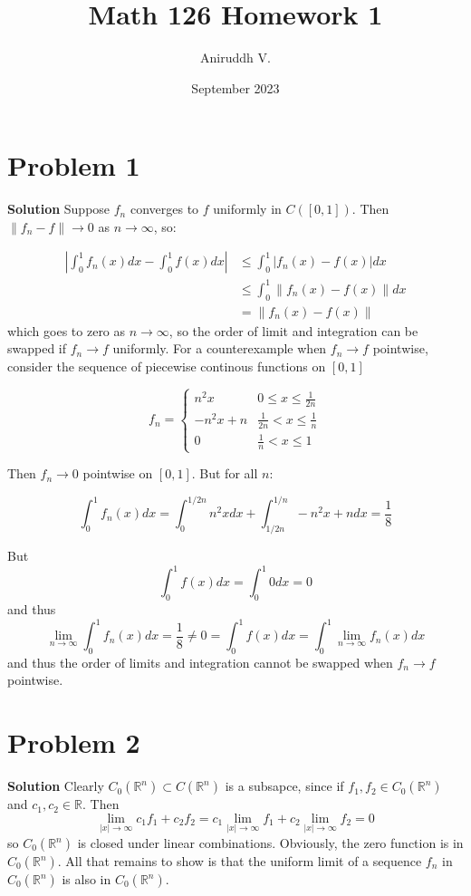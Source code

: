 \documentclass{article}
\title{Math 126 Homework 1}
\author{Aniruddh V.}
\date{September 2023}
\newcommand{\R}{\mathbb{R}}
\begin{document}
\maketitle

\section{Problem 1}
\textbf{Solution } Suppose $f_n$ converges to $f$ uniformly in $C([0, 1])$. Then $ \| f_n - f\| \rightarrow 0$ as $n \rightarrow \infty$, so:

\begin{align*}
    \left | \int_0^1 f_n(x)dx - \int_0^1 f(x)dx      \right | & \leq \int_0^1 | f_n(x) - f(x)| dx \\
    & \leq \int_0^1 \| f_n(x) - f(x) \| dx \\
    &= \| f_n(x) - f(x) \| 
\end{align*} which goes to zero as $n \rightarrow \infty$, so the order of limit and integration can be swapped if $f_n \rightarrow f$ uniformly. For a counterexample 
when $f_n \rightarrow f$ pointwise, consider the sequence of piecewise continous functions on $[0, 1]$

\begin{equation*}
    f_n = \begin{cases}
            n^2 x & 0  \leq x \leq \frac{1}{2n} \\

            -n^2 x + n  & \frac{1}{2n} < x \leq \frac{1}{n} \\

            0 &  \frac{1}{n} < x \leq 1
        
        \end{cases}
\end{equation*}

Then $f_n \rightarrow 0$ pointwise on $[0, 1]$. But for all $n$:

\[\int_0^1 f_n(x)dx = \int_0^{1/2n} n^2x dx + \int_{1/2n}^{1/n} -n^2 x + n dx = \frac{1}{8}\]

But 
\[\int_0^1 f(x) dx = \int_0^1 0dx = 0\] and thus
\[ \lim_{n \rightarrow \infty} \int_0^1 f_n(x) dx = \frac{1}{8} \neq 0 = \int_0^1 f(x) dx = \int_0^1 \lim_{n\rightarrow \infty} f_n (x) dx\] 
and thus the order of limits and integration cannot be swapped when $f_n \rightarrow f$ pointwise.

\section{Problem 2}  
\textbf{Solution } Clearly $C_0(\R^n) \subset C(\R ^n)$ is a subsapce, since if $f_1, f_2 \in C_0(\R^n)$ and $c_1, c_2 \in \R$. Then
\[ \lim_{|x| \rightarrow \infty}c_1 f_1 + c_2 f_2  = c_1 \lim_{|x| \rightarrow \infty} f_1  + c_2 \lim_{|x| \rightarrow \infty} f_2 = 0\] so $C_0(\R^n)$
is closed under linear combinations. Obviously, the zero function is in $C_0(\R^n)$. All that remains to show is that the uniform limit of a sequence $f_n$ in $C_0(\R^n)$
is also in $C_0(\R^n)$. 
\end{document}
